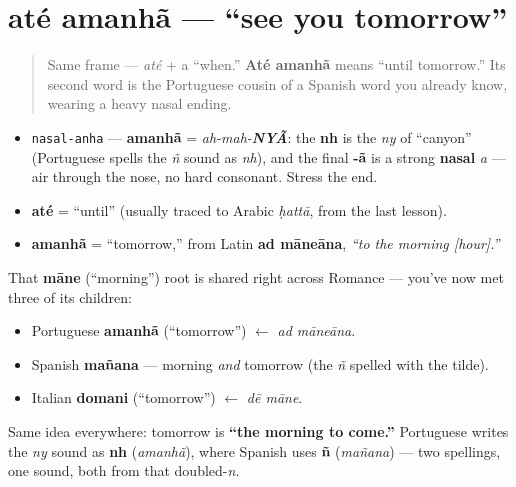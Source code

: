 \section[até amanhã]{até amanhã — \textquotedblleft{}see you tomorrow\textquotedblright{}}

\label{lesson:PT-C04-ate-amanha}



\begin{quote}
Same frame — \emph{até} + a “when.” \textbf{Até amanhã} means “until tomorrow.” Its second word is the Portuguese cousin of a Spanish word you already know, wearing a heavy nasal ending.
\end{quote}

\begin{sounds}
\begin{itemize}
\raggedright
  \item \texttt{nasal-anha} — \textbf{amanhã} = \emph{ah-mah-\textbf{NYÃ}}: the \textbf{nh} is the \emph{ny} of \textquotedblleft{}canyon\textquotedblright{} (Portuguese spells the \emph{ñ} sound as \emph{nh}), and the final \textbf{-ã} is a strong \textbf{nasal} \emph{a} — air through the nose, no hard consonant. Stress the end.
\end{itemize}
\end{sounds}

\begin{cousinweb}
\begin{itemize}
\raggedright
  \item \textbf{até} = \textquotedblleft{}until\textquotedblright{} (usually traced to Arabic \emph{ḥattā}, from the last lesson).
  \item \textbf{amanhã} = \textquotedblleft{}tomorrow,\textquotedblright{} from Latin \textbf{ad māneāna}, \emph{\textquotedblleft{}to the morning {[}hour{]}.\textquotedblright{}}
\end{itemize}

That \textbf{māne} (\textquotedblleft{}morning\textquotedblright{}) root is shared right across Romance — you've now met three of its children:

\begin{itemize}
\raggedright
  \item Portuguese \textbf{amanhã} (\textquotedblleft{}tomorrow\textquotedblright{}) $\leftarrow$ \emph{ad māneāna}.
  \item Spanish \textbf{mañana} — morning \emph{and} tomorrow (the \emph{ñ} spelled with the tilde).
  \item Italian \textbf{domani} (\textquotedblleft{}tomorrow\textquotedblright{}) $\leftarrow$ \emph{dē māne}.
\end{itemize}

Same idea everywhere: tomorrow is \textbf{\textquotedblleft{}the morning to come.\textquotedblright{}} Portuguese writes the \emph{ny} sound as \textbf{nh} (\emph{amanhã}), where Spanish uses \textbf{ñ} (\emph{mañana}) — two spellings, one sound, both from that doubled-\emph{n}.
\end{cousinweb}

